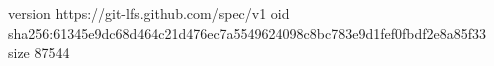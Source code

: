 version https://git-lfs.github.com/spec/v1
oid sha256:61345e9dc68d464c21d476ec7a5549624098c8bc783e9d1fef0fbdf2e8a85f33
size 87544
